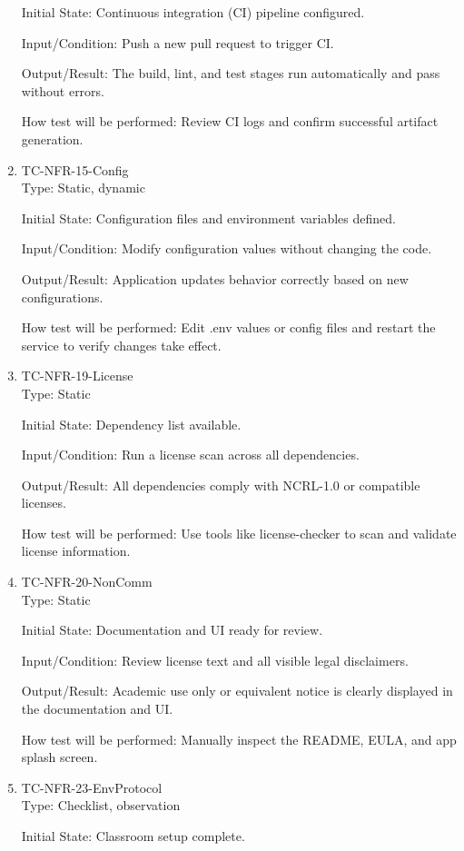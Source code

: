 \documentclass[12pt, titlepage]{article}
\begin{document}
\begin{enumerate}
Initial State: Continuous integration (CI) pipeline configured.

Input/Condition: Push a new pull request to trigger CI.

Output/Result: The build, lint, and test stages run automatically and pass without errors.

How test will be performed: Review CI logs and confirm successful artifact generation.

\item{TC-NFR-15-Config\\}
Type: Static, dynamic

Initial State: Configuration files and environment variables defined.

Input/Condition: Modify configuration values without changing the code.

Output/Result: Application updates behavior correctly based on new configurations.

How test will be performed: Edit .env values or config files and restart the service to verify changes take effect.

\item{TC-NFR-19-License\\}
Type: Static

Initial State: Dependency list available.

Input/Condition: Run a license scan across all dependencies.

Output/Result: All dependencies comply with NCRL-1.0 or compatible licenses.

How test will be performed: Use tools like license-checker to scan and validate license information.

\item{TC-NFR-20-NonComm\\}
Type: Static

Initial State: Documentation and UI ready for review.

Input/Condition: Review license text and all visible legal disclaimers.

Output/Result: Academic use only or equivalent notice is clearly displayed in the documentation and UI.

How test will be performed: Manually inspect the README, EULA, and app splash screen.

\item{TC-NFR-23-EnvProtocol\\}
Type: Checklist, observation

Initial State: Classroom setup complete.


\end{enumerate}
\end{document}
